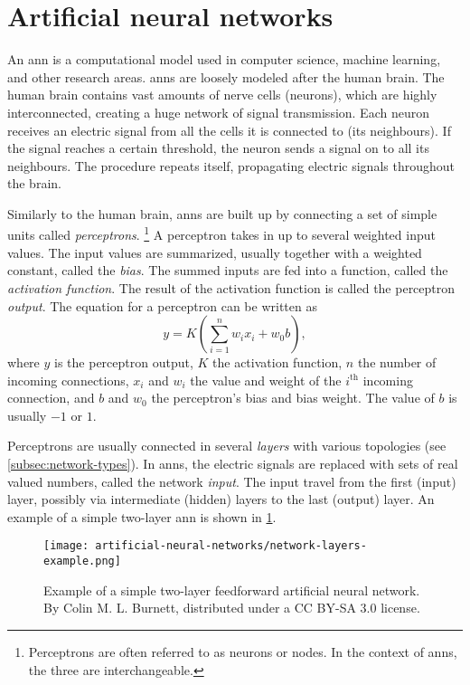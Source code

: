 \section{Artificial neural networks}

An \gls{ann} is a computational model used in computer science, machine learning, and other research areas. \glspl{ann} are loosely modeled after the human brain. The human brain contains vast amounts of nerve cells (neurons), which are highly interconnected, creating a huge network of signal transmission. Each neuron receives an electric signal from all the cells it is connected to (its neighbours). If the signal reaches a certain threshold, the neuron sends a signal on to all its neighbours. The procedure repeats itself, propagating electric signals throughout the brain.

Similarly to the human brain, \glspl{ann} are built up by connecting a set of simple units called \textit{perceptrons}. \footnote{Perceptrons are often referred to as neurons or nodes. In the context of \glspl{ann}, the three are interchangeable.} A perceptron takes in up to several weighted input values. The input values are summarized, usually together with a weighted constant, called the \textit{bias}. The summed inputs are fed into a function, called the \textit{activation function}. The result of the activation function is called the perceptron \textit{output}. The equation for a perceptron can be written as
\begin{equation*}
    y = K \left(\sum_{i = 1}^{n} w_{i}x_{i} + w_{0}b \right),
\end{equation*}
where $y$ is the perceptron output, $K$ the activation function, $n$ the number of incoming connections, $x_{i}$ and $w_{i}$ the value and weight of the $i^{\text{th}}$ incoming connection, and $b$ and $w_{0}$ the perceptron's bias and bias weight. The value of $b$ is usually $-1$ or $1$.

Perceptrons are usually connected in several \textit{layers} with various topologies (see \cref{subsec:network-types}). In \glspl{ann}, the electric signals are replaced with sets of real valued numbers, called the network \textit{input}. The input travel from the first (input) layer, possibly via intermediate (hidden) layers to the last (output) layer. An example of a simple two-layer \gls{ann} is shown in \cref{fig:network-layers-example}.

\begin{figure}
    \centering
    \texttt{[image: artificial-neural-networks/network-layers-example.png]}
    \caption{Example of a simple two-layer feedforward artificial neural network. By Colin M. L. Burnett, distributed under a CC BY-SA 3.0 license.}
    \label{fig:network-layers-example}
\end{figure}

